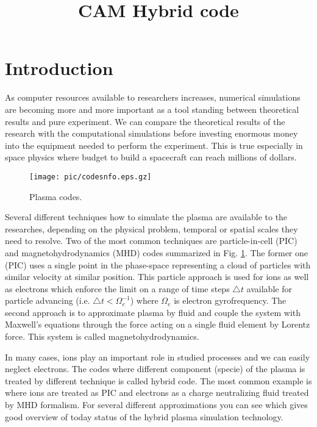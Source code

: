 \documentclass[oneside,branding,toc,article]{satdoc}
\title{CAM Hybrid code}
\begin{document}
\maketitle

\section{Introduction}

As computer resources available to researchers increases, numerical simulations
are becoming more and more important as a tool standing between theoretical
results and pure experiment.  We can compare the theoretical results of the
research with the computational simulations before investing enormous money
into the equipment needed to perform the experiment.  This is true especially
in space physics where budget to build a spacecraft can reach millions of
dollars.

\begin{figure}[!hbp]
  \centering
  \texttt{[image: pic/codesnfo.eps.gz]}
  \caption{Plasma codes.}
  \label{fig:nfo}
\end{figure}

Several different techniques how to simulate the plasma are available to the
researches, depending on the physical problem, temporal or spatial scales they
need to resolve.  Two of the most common techniques are particle-in-cell (PIC)
and magnetohydrodynamics (MHD) codes summarized in Fig.  \ref{fig:nfo}.  The
former one (PIC) uses a single point in the phase-space representing a cloud of
particles with similar velocity at similar position.  This particle approach is
used for ions as well as electrons which enforce the limit on a range of time
steps $\triangle t$ available for particle advancing (i.e. $\triangle t <
\Omega_e^{-1}$) where $\Omega_e$ is electron gyrofrequency.  The second
approach is to approximate plasma by fluid and couple the system with Maxwell's
equations through the force acting on a single fluid element by Lorentz
force. This system is called magnetohydrodynamics.

In many cases, ions play an important role in studied processes and we can
easily neglect electrons. The codes where different component (specie) of the
plasma is treated by different technique is called hybrid code. The most common
example is where ions are treated as PIC and electrons as a charge neutralizing
fluid treated by MHD formalism.  For several different approximations you can
see \cite{lipatov02} which gives good overview of today status of the hybrid
plasma simulation technology.
\end{document}
